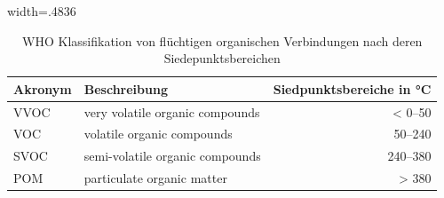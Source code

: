 \begin{table}[htbp]
    \centering
    \caption{WHO Klassifikation von flüchtigen organischen Verbindungen nach deren Siedepunktsbereichen \cite{who-classification-secondary}}
    \begin{adjustbox}{width=.4836\textwidth}
    \begin{tabular}{llr}\toprule
      {Akronym}
    & {Beschreibung}
    & {Siedpunktsbereiche in \unit{\celsius}} \\
    \midrule
    VVOC & very volatile organic compounds & < 0--50  \\
    VOC  & volatile organic compounds      & 50--240  \\
    SVOC & semi-volatile organic compounds & 240--380 \\
    POM  & particulate organic matter      & > 380    \\
    \bottomrule
    \end{tabular}
    \end{adjustbox}
    \label{tab:voc-klassifikation}
\end{table}